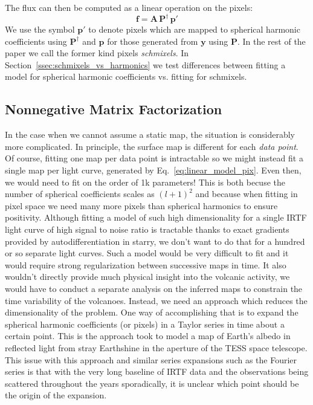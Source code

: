\documentclass[modern]{aastex62}
\begin{document}
The flux can then be computed as a linear operation on the pixels: 
\begin{equation}
    \mathbf{f}=\mathbf{A}\,\mathbf{P}^\dagger\,\mathbf{p}'
    \label{eq:linear_model_pix}
\end{equation}
We use the symbol $\mathbf{p}'$ to denote pixels which are mapped to spherical harmonic coefficients using $\mathbf{P}^\dagger$ and $\mathbf{p}$ for those generated from $\mathbf{y}$ using $\mathbf{P}$.
In the rest of the paper we call the former kind pixels \emph{schmixels}.
In Section~\ref{ssec:schmixels_vs_harmonics} we test differences between fitting a model for spherical harmonic coefficients vs. fitting for schmixels.

\subsection{Nonnegative Matrix Factorization}
\label{ssec:nmf}
In the case when we cannot assume a static map, the situation is considerably more complicated.
In principle, the surface map is different for each \emph{data point}.
Of course, fitting one map per data point is intractable so we might instead fit a single map per light curve, generated by Eq.~\ref{eq:linear_model_pix}.
Even then, we would need to fit on the order of 1k parameters!
This is both becuse the number of spherical coefficients scales as $(l+1)^2$ and because when fitting in pixel space we need many more pixels than spherical harmonics to ensure positivity.
Although fitting a model of such high dimensionality for a single IRTF light curve of high signal to noise ratio is tractable thanks to exact gradients provided by autodifferentiation in \textsf{starry}, we don't want to do that for a hundred or so separate light curves.
Such a model would be very difficult to fit and it would require strong regularization between successive maps in time.
It also wouldn't directly provide much physical insight into the volcanic activity, we would have to conduct a separate analysis on the inferred maps to constrain the time variability of the volcanoes.
Instead, we need an approach which reduces the dimensionality of the problem.
One way of accomplishing that is to expand the spherical harmonic coefficients (or pixels) in a Taylor series in time about a certain point.
This is the approach \cite{luger_tess_2019} took to model a map of Earth's albedo in reflected light from stray Earthshine in the aperture of the TESS space telescope.
This issue with this approach and similar series expansions such as the Fourier series is that with the very long baseline of IRTF data and the observations being scattered throughout the years sporadically, it is unclear which point should be the origin of the expansion.
\end{document}
